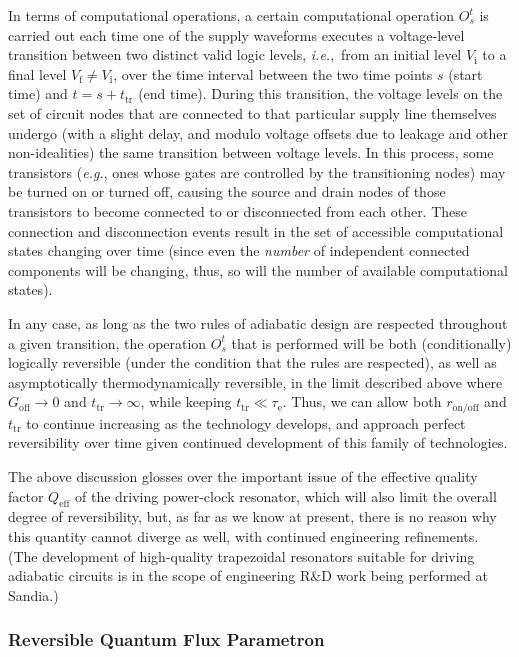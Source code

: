 \documentclass[preprints,article,accept,moreauthors,pdftex]{Definitions/mdpi}
\begin{document}
\begin{paracol}{2}
In terms of computational operations, a certain computational operation $O_s^t$ is carried out each time one of the supply waveforms executes a voltage-level transition between two distinct valid logic levels, \emph{i.e.},\ from an initial level $V_\mathrm{i}$ to a final level $V_\mathrm{f} \neq V_\mathrm{i}$, over the time interval between the two time points $s$ (start time) and $t=s+t_\mathrm{tr}$ (end time). During this transition, the voltage levels on the set of circuit nodes that are connected to that particular supply line themselves undergo (with a slight delay, and modulo voltage offsets due to leakage and other non-idealities) the same transition between voltage levels.  In this process, some transistors (\emph{e.g.}, ones whose gates are controlled by the transitioning nodes) may be turned on or turned off, causing the source and drain nodes of those transistors to become connected to or disconnected from each other.  These connection and disconnection events result in the set of accessible computational states changing over time (since even the \emph{number} of independent connected components will be changing, thus, so will the number of available computational states).

In any case, as long as the two rules of adiabatic design are respected throughout a given transition, the operation $O_s^t$ that is performed will be both (conditionally) logically reversible (under the condition that the rules are respected), as well as asymptotically thermodynamically reversible, in the limit described above where $G_\mathrm{off}\rightarrow 0$ and $t_\mathrm{tr}\rightarrow\infty$, while keeping $t_\mathrm{tr}\ll\tau_\mathrm{e}$. Thus, we can allow both $r_\mathrm{on/off}$ and $t_\mathrm{tr}$ to continue increasing as the technology develops, and approach perfect reversibility over time given continued development of this family of technologies. 

The above discussion glosses over the important issue of the effective quality factor $Q_\mathrm{eff}$ of the driving power-clock resonator, which will also limit the overall degree of reversibility, but, as far as we know at present, there is no reason why this quantity cannot diverge as well, with continued engineering refinements. (The development of high-quality trapezoidal resonators suitable for driving adiabatic circuits is in the scope of engineering R\&D work being performed at Sandia.)

\subsubsection{Reversible Quantum Flux Parametron}
\label{sssec:rqfp}


\end{paracol}
\end{document}
